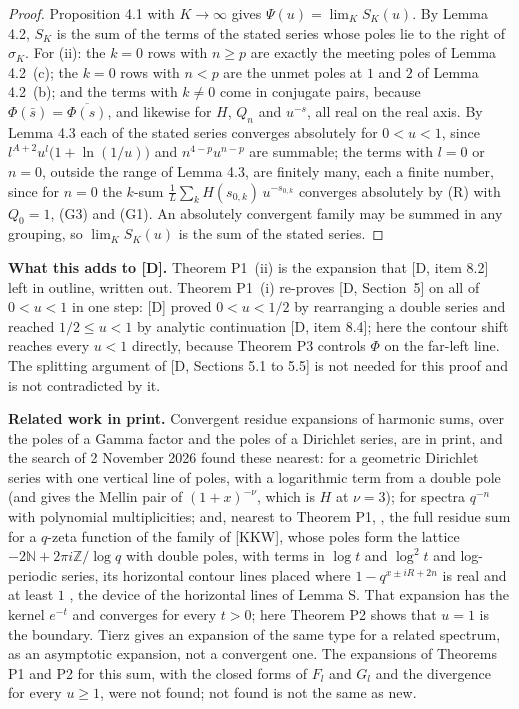\documentclass[11pt]{article}
\begin{document}
\begin{proof}
Proposition 4.1 with $K\to\infty$ gives $\Psi(u)=\lim_KS_K(u)$. By Lemma 4.2, $S_K$ is the sum of the terms of the stated series whose poles lie to the right of $\sigma_K$. For (ii): the $k=0$ rows with $n\ge p$ are exactly the meeting poles of Lemma 4.2~(c); the $k=0$ rows with $n<p$ are the unmet poles at $1$ and $2$ of Lemma 4.2~(b); and the terms with $k\ne0$ come in conjugate pairs, because $\Phi(\bar s)=\overline{\Phi(s)}$, and likewise for $H$, $Q_n$ and $u^{-s}$, all real on the real axis. By Lemma 4.3 each of the stated series converges absolutely for $0<u<1$, since $l^{A+2}u^l\bigl(1+\ln(1/u)\bigr)$ and $n^{4-p}u^{n-p}$ are summable; the terms with $l=0$ or $n=0$, outside the range of Lemma 4.3, are finitely many, each a finite number, since for $n=0$ the $k$-sum $\frac1L\sum_kH(s_{0,k})\,u^{-s_{0,k}}$ converges absolutely by (R) with $Q_0=1$, (G3) and (G1). An absolutely convergent family may be summed in any grouping, so $\lim_KS_K(u)$ is the sum of the stated series.
\end{proof}

\noindent\textbf{What this adds to [D].} Theorem P1~(ii) is the expansion that [D, item 8.2] left in outline, written out. Theorem P1~(i) re-proves [D, Section~5] on all of $0<u<1$ in one step: [D] proved $0<u<1/2$ by rearranging a double series and reached $1/2\le u<1$ by analytic continuation [D, item 8.4]; here the contour shift reaches every $u<1$ directly, because Theorem P3 controls $\Phi$ on the far-left line. The splitting argument of [D, Sections 5.1 to 5.5] is not needed for this proof and is not contradicted by it.

\medskip
\noindent\textbf{Related work in print.} Convergent residue expansions of harmonic sums, over the poles of a Gamma factor and the poles of a Dirichlet series, are in print, and the search of 2 November 2026 found these nearest: \cite[Example~12, pages~30 and~31]{FGD} for a geometric Dirichlet series with one vertical line of poles, with a logarithmic term from a double pole (and \cite[Example~5, page~22]{FGD} gives the Mellin pair of $(1+x)^{-\nu}$, which is $H$ at $\nu=3$); \cite[Proposition~4.13, pages~32 and~33]{EZ} for spectra $q^{-n}$ with polynomial multiplicities; and, nearest to Theorem P1, \cite[Proposition~4.3, page~17, and Theorem~4.4, page~22]{EIS}, the full residue sum for a $q$-zeta function of the family of [KKW], whose poles form the lattice $-2\mathbb{N}+2\pi i\mathbb{Z}/\log q$ with double poles, with terms in $\log t$ and $\log^2t$ and log-periodic series, its horizontal contour lines placed where $1-q^{x\pm iR+2n}$ is real and at least $1$ \cite[page~18]{EIS}, the device of the horizontal lines of Lemma S. That expansion has the kernel $e^{-t}$ and converges for every $t>0$; here Theorem P2 shows that $u=1$ is the boundary. Tierz \cite[eqs.~(3.20) to~(3.27)]{Ti} gives an expansion of the same type for a related spectrum, as an asymptotic expansion, not a convergent one. The expansions of Theorems P1 and P2 for this sum, with the closed forms of $F_l$ and $G_l$ and the divergence for every $u\ge1$, were not found; not found is not the same as new.
\end{document}
